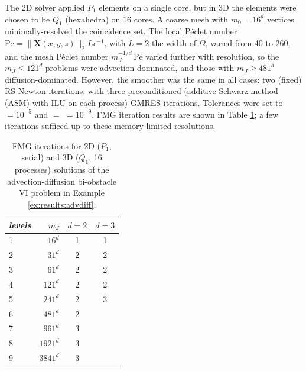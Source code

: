 \documentclass[review,hidelinks,onefignum,onetabnum,final]{siamart220329}  %
\newcommand{\eps}{\epsilon}
\newcommand{\bX}{\mathbf{X}}
\begin{document}
\begin{example}
The 2D solver applied $P_1$ elements on a single core, but in 3D the elements were chosen to be $Q_1$ (hexahedra) on $16$ cores.  A coarse mesh with $m_0=16^d$ vertices minimally-resolved the coincidence set.  The local Péclet number $\text{Pe}=\|\bX(x,y,z)\|_2 L \eps^{-1}$, with $L=2$ the width of $\Omega$, varied from 40 to 260, and the mesh Péclet number $m_J^{-1/d}\,\text{Pe}$ varied further with resolution, so the $m_J\le 121^d$ problems were advection-dominated, and those with $m_J\ge 481^d$ diffusion-dominated.  However, the smoother was the same in all cases: two (fixed) RS Newton iterations, with three preconditioned (additive Schwarz method (ASM) with ILU on each process) GMRES iterations.  Tolerances were set to  $=10^{-5}$ and  $=$  $= 10^{-9}$.  FMG iteration results are shown in Table \ref{tab:results:advdiff}; a few iterations sufficed up to these memory-limited resolutions.
\end{example}

\begin{table}[ht]
\centering
\begin{tabular}{lr@{\hskip 7mm}c@{\hskip 4mm}c}
\toprule
\emph{levels} & $m_J$ & $d=2$ & $d=3$ \\
\midrule
 1 &    $16^d$ & 1 & 1 \\
 2 &    $31^d$ & 2 & 2 \\
 3 &    $61^d$ & 2 & 2 \\
 4 &   $121^d$ & 2 & 2 \\
 5 &   $241^d$ & 2 & 3 \\
 6 &   $481^d$ & 2 \\
 7 &   $961^d$ & 3 \\
 8 &  $1921^d$ & 3 \\
 9 &  $3841^d$ & 3 \\
\bottomrule
\end{tabular}
\bigskip
\caption{FMG iterations for 2D ($P_1$, serial) and 3D ($Q_1$, 16 processes) solutions of the advection-diffusion bi-obstacle VI problem in Example \ref{ex:results:advdiff}.}
\label{tab:results:advdiff}
\end{table}
\end{document}
